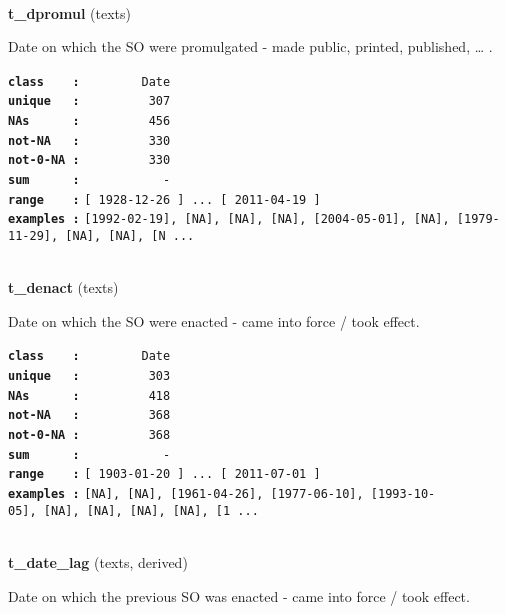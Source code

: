 \documentclass[]{article}
\begin{document}
~

\textbf{t\_dpromul} (texts)

Date on which the SO were promulgated - made public, printed, published,
\ldots{} .

\textbf{\texttt{class\ \ \ \ :}} \texttt{~~~~~~~~Date}\\
\textbf{\texttt{unique\ \ \ :}} \texttt{~~~~~~~~~307}\\
\textbf{\texttt{NAs\ \ \ \ \ \ :}} \texttt{~~~~~~~~~456}\\
\textbf{\texttt{not-NA\ \ \ :}} \texttt{~~~~~~~~~330}\\
\textbf{\texttt{not-0-NA\ :}} \texttt{~~~~~~~~~330}\\
\textbf{\texttt{sum\ \ \ \ \ \ :}} \texttt{~~~~~~~~~~~-}\\
\textbf{\texttt{range\ \ \ \ :}}
\texttt{{[}\ 1928-12-26\ {]}\ ...\ {[}\ 2011-04-19\ {]}}\\
\textbf{\texttt{examples\ :}}
\texttt{{[}1992-02-19{]},\ {[}NA{]},\ {[}NA{]},\ {[}NA{]},\ {[}2004-05-01{]},\ {[}NA{]},\ {[}1979-11-29{]},\ {[}NA{]},\ {[}NA{]},\ {[}N\ ...}\\

~

\textbf{t\_denact} (texts)

Date on which the SO were enacted - came into force / took effect.

\textbf{\texttt{class\ \ \ \ :}} \texttt{~~~~~~~~Date}\\
\textbf{\texttt{unique\ \ \ :}} \texttt{~~~~~~~~~303}\\
\textbf{\texttt{NAs\ \ \ \ \ \ :}} \texttt{~~~~~~~~~418}\\
\textbf{\texttt{not-NA\ \ \ :}} \texttt{~~~~~~~~~368}\\
\textbf{\texttt{not-0-NA\ :}} \texttt{~~~~~~~~~368}\\
\textbf{\texttt{sum\ \ \ \ \ \ :}} \texttt{~~~~~~~~~~~-}\\
\textbf{\texttt{range\ \ \ \ :}}
\texttt{{[}\ 1903-01-20\ {]}\ ...\ {[}\ 2011-07-01\ {]}}\\
\textbf{\texttt{examples\ :}}
\texttt{{[}NA{]},\ {[}NA{]},\ {[}1961-04-26{]},\ {[}1977-06-10{]},\ {[}1993-10-05{]},\ {[}NA{]},\ {[}NA{]},\ {[}NA{]},\ {[}NA{]},\ {[}1\ ...}\\

~

\textbf{t\_date\_lag} (texts, derived)

Date on which the previous SO was enacted - came into force / took
effect.
\end{document}
